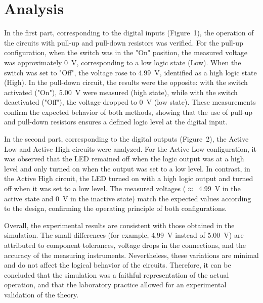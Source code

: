 \documentclass[12pt]{article}  %
\begin{document}
\section{Analysis} %
In the first part, corresponding to the digital inputs (Figure~1), the operation of the circuits with pull-up and pull-down resistors was verified. For the pull-up configuration, when the switch was in the "On" position, the measured voltage was approximately 0~V, corresponding to a low logic state (Low). When the switch was set to "Off", the voltage rose to 4.99~V, identified as a high logic state (High). In the pull-down circuit, the results were the opposite: with the switch activated ("On"), 5.00~V were measured (high state), while with the switch deactivated ("Off"), the voltage dropped to 0~V (low state). These measurements confirm the expected behavior of both methods, showing that the use of pull-up and pull-down resistors ensures a defined logic level at the digital input.

In the second part, corresponding to the digital outputs (Figure~2), the Active Low and Active High circuits were analyzed. For the Active Low configuration, it was observed that the LED remained off when the logic output was at a high level and only turned on when the output was set to a low level. In contrast, in the Active High circuit, the LED turned on with a high logic output and turned off when it was set to a low level. The measured voltages ($\approx$~4.99~V in the active state and 0~V in the inactive state) match the expected values according to the design, confirming the operating principle of both configurations.

Overall, the experimental results are consistent with those obtained in the simulation. The small differences (for example, 4.99~V instead of 5.00~V) are attributed to component tolerances, voltage drops in the connections, and the accuracy of the measuring instruments. Nevertheless, these variations are minimal and do not affect the logical behavior of the circuits. Therefore, it can be concluded that the simulation was a faithful representation of the actual operation, and that the laboratory practice allowed for an experimental validation of the theory.
\clearpage %
\end{document}
